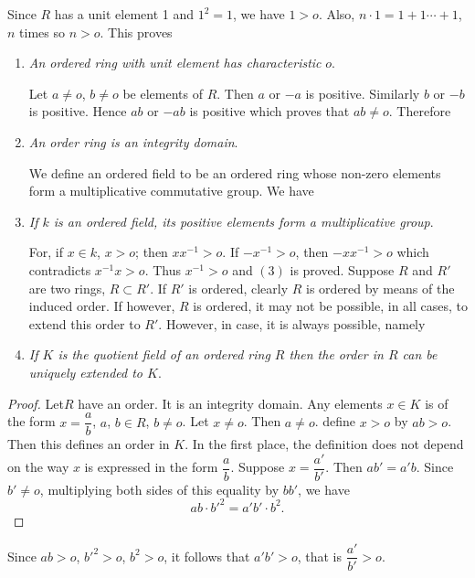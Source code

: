Since $R$ has a unit element 1 and $1^2=1$, we have $1 >o$. Also,
$n \cdot  1=1+1 \cdots + 1$, $n$ times so $n >  o$. This  proves 
\begin{enumerate}
\renewcommand{\labelenumi}{\theenumi)}
\item \textit{An ordered ring with unit element has characteristic}
  $o$. 

Let $a \neq o$, $b \neq o$ be elements of $R$. Then  $a$ or $-a$ is
positive. Similarly $b$ or $-b$ is positive. Hence $ab$ or $-ab$ is
positive which proves that $ab \neq o$. Therefore  

\item \textit{An order ring is an integrity domain}.
 
We  define an ordered field to be an ordered ring  whose non-zero
elements form a multiplicative commutative group. We have  

\item \textit{If  $k$ is an ordered field, its positive elements form
  a multiplicative group}. 

For, if $x \in  k$, $x >  o$; then  $xx^{-1}>o$. If $-x^{-1} >o$, then
$-xx^{-1}> o$ which contradicts $x^{-1} x >o$. Thus $x^{-1} >o$ and
$(3)$ is proved. 
Suppose  $R$ and $R'$ are two rings, $R \subset R'$. If $R'$ is
ordered, clearly $R$ is ordered by means of the induced order. If
however, $R$ is ordered, it may not be possible, in all cases, to
extend this order to $R'$. However, in case, it is always possible,
namely 

\item \textit{If $K$ is the quotient field of an ordered ring $R$ then
  the order in $R$ can be uniquely extended to $K$}. 
\end{enumerate}

\begin{proof} %
Let\pageoriginale $R$ have an order. It is an integrity domain. Any
elements $x \in 
K$ is of the form $x = \dfrac{a}{b}$, $a$, $b \in R$, $b \neq o$. Let $x
\neq o$. Then $a \neq o$. define $x >  o$ by $ab >o$. Then this
defines an order in $K$. In the first place, the definition does not
depend on the way $x$ is expressed in the form $\dfrac{a}{b}$. Suppose
$x= \dfrac{a'}{b'}$. Then $ab' =a'b$. Since $b' \neq o$, multiplying
both sides of this equality by $bb'$, we have 
$$
ab \cdot b'^2= a'b' \cdot b^2.
$$
\end{proof}

Since $ab >o$, $b'^{2}>o$, $b^{2} >o$, it follows that $a'b' >o$, that
is $\dfrac{a'}{b'} >o$. 

